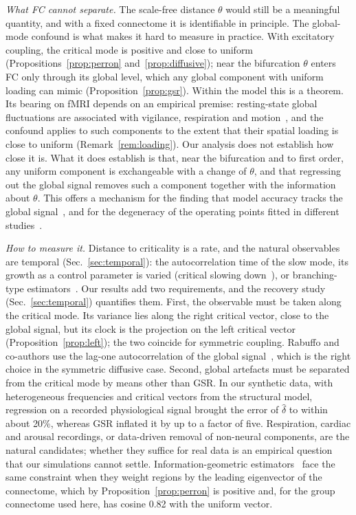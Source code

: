 \documentclass[aip,cha,reprint,amsmath,amssymb]{revtex4-2}
\theoremstyle{remark}
\begin{document}
\emph{What FC cannot separate.} The scale-free distance $\theta$ would still be a meaningful quantity, and with a fixed connectome it is identifiable in principle. The global-mode confound is what makes it hard to measure in practice. With excitatory coupling, the critical mode is positive and close to uniform (Propositions~\ref{prop:perron} and~\ref{prop:diffusive}); near the bifurcation $\theta$ enters FC only through its global level, which any global component with uniform loading can mimic (Proposition~\ref{prop:gsr}). Within the model this is a theorem. Its bearing on fMRI depends on an empirical premise: resting-state global fluctuations are associated with vigilance, respiration and motion~\cite{Liu2017}, and the confound applies to such components to the extent that their spatial loading is close to uniform (Remark~\ref{rem:loading}). Our analysis does not establish how close it is. What it does establish is that, near the bifurcation and to first order, any uniform component is exchangeable with a change of $\theta$, and that regressing out the global signal removes such a component together with the information about $\theta$. This offers a mechanism for the finding that model accuracy tracks the global signal~\cite{Aquino2022}, and for the degeneracy of the operating points fitted in different studies~\cite{Deco2017dynamics,Alexandersen2025}.

\emph{How to measure it.} Distance to criticality is a rate, and the natural observables are temporal (Sec.~\ref{sec:temporal}): the autocorrelation time of the slow mode, its growth as a control parameter is varied (critical slowing down~\cite{Scheffer2009}), or branching-type estimators~\cite{Wilting2018}. Our results add two requirements, and the recovery study (Sec.~\ref{sec:temporal}) quantifies them. First, the observable must be taken along the critical mode. Its variance lies along the right critical vector, close to the global signal, but its clock is the projection on the left critical vector (Proposition~\ref{prop:left}); the two coincide for symmetric coupling. Rabuffo and co-authors use the lag-one autocorrelation of the global signal~\cite{Rabuffo2025}, which is the right choice in the symmetric diffusive case. Second, global artefacts must be separated from the critical mode by means other than GSR. In our synthetic data, with heterogeneous frequencies and critical vectors from the structural model, regression on a recorded physiological signal brought the error of $\hat\delta$ to within about 20\%, whereas GSR inflated it by up to a factor of five. Respiration, cardiac and arousal recordings, or data-driven removal of non-neural components, are the natural candidates; whether they suffice for real data is an empirical question that our simulations cannot settle. Information-geometric estimators~\cite{Du2026} face the same constraint when they weight regions by the leading eigenvector of the connectome, which by Proposition~\ref{prop:perron} is positive and, for the group connectome used here, has cosine 0.82 with the uniform vector.
\end{document}
